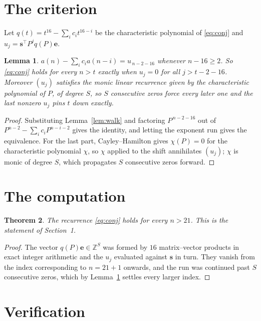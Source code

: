 \documentclass[11pt,a4paper]{article}
\theoremstyle{plain}
\newtheorem{theorem}{Theorem}
\newtheorem{lemma}[theorem]{Lemma}
\theoremstyle{definition}
\begin{document}
\section{The criterion}

Let $q(t)=t^{16}-\sum_i c_i t^{16-i}$ be the characteristic polynomial of
\eqref{eq:conj} and $u_j=\mathbf{s}^{\!\top}P^{j}q(P)\mathbf{e}$.

\begin{lemma}\label{lem:crit}
$a(n)-\sum_i c_i a(n-i)=u_{\,n-2-16}$ whenever $n-16\ge2$. So \eqref{eq:conj}
holds for every $n>t$ exactly when $u_j=0$ for all $j>t-2-16$. Moreover $(u_j)$
satisfies the monic linear recurrence given by the characteristic polynomial of $P$, of
degree $S$, so $S$ consecutive zeros force every later one and the last nonzero $u_j$ pins
$t$ down exactly.
\end{lemma}

\begin{proof}
Substituting Lemma~\ref{lem:walk} and factoring $P^{\,n-2-16}$ out of
$P^{n-2}-\sum_i c_i P^{n-i-2}$ gives the identity, and letting the exponent run gives the
equivalence. For the last part, Cayley--Hamilton gives $\chi(P)=0$ for the characteristic
polynomial $\chi$, so $\chi$ applied to the shift annihilates $(u_j)$; $\chi$ is monic of
degree $S$, which propagates $S$ consecutive zeros forward.
\end{proof}

\section{The computation}

\begin{theorem}
The recurrence \eqref{eq:conj} holds for every $n>21$. This is the statement of
Section~1.
\end{theorem}

\begin{proof}
The vector $q(P)\mathbf{e}\in\mathbb{Z}^{S}$ was formed by $16$ matrix--vector
products in exact integer arithmetic and the $u_j$ evaluated against $\mathbf{s}$ in turn.
They vanish from the index corresponding to $n=21+1$ onwards, and the run was continued
past $S$ consecutive zeros, which by Lemma~\ref{lem:crit} settles every larger index.
\end{proof}

\section{Verification}
\end{document}
